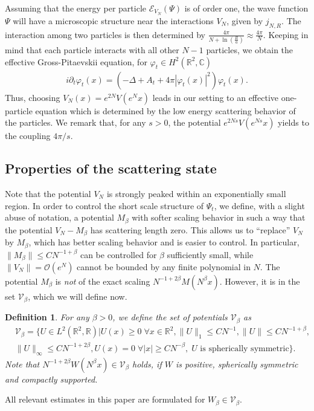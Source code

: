 \documentclass[11pt, english, american]{article}
\newtheorem{definition}[theorem] {Definition}
\renewcommand{\phi}{\varphi}
\begin{document}
Assuming that the energy per particle $\mathcal{E}_{V_N}(\Psi)$ is of order one, the wave function $\Psi$ will have a microscopic structure near the interactions $V_N$, given by $j_{N,R}$. 
The interaction among two particles is then determined by
$   \frac{4 \pi}{N+ \ln \left(\frac{R}{a}\right)} \approx \frac{4 \pi}{N}$. Keeping in mind that each particle interacts with all other $N-1$ particles, we obtain the effective Gross-Pitaevskii equation, for $\varphi_t \in H^2( \mathbb{R}^2, \mathbb{C})$
\begin{align*}
i \partial_t \varphi_t(x) = (- \Delta+A_t+ 4 \pi | \varphi_t(x)|^2) \varphi_t(x).
\end{align*}
Thus, choosing $V_N(x)= e^{2N} V(e^Nx)$ leads in our setting to an effective one-particle equation which is determined by the low energy scattering behavior of the particles. We remark that, for any $s>0$, the potential
$e^{2Ns} V(e^{Ns}x)$ yields to the coupling $4 \pi/ s$. 


\subsection{Properties of the scattering state}
Note that the potential $V_N$ is strongly peaked within an exponentially small region. 
In order to control the short scale structure of $\Psi_t$, we define, with a slight abuse of notation, a
potential $M_{\beta}$ with softer scaling behavior in such a way that the potential $V_N -M_\beta$
has scattering length zero.
This allows us to ``replace'' $V_N$  by $M_\beta$, which has better scaling behavior and is easier to control.
In particular, $\|M_\beta\| \leq C N^{-1+\beta}$ can be controlled for $\beta$ sufficiently small, while $\|V_N\|=\mathcal{O}(e^N)$ cannot be bounded by any finite polynomial in $N$. 
The potential $M_\beta$ is \textit{not} of the exact scaling $N^{-1+2\beta} M(N^{\beta} x)$. 
However, it is in the set $\mathcal{V}_{\beta}$, which we will define now.


\begin{definition}
For any $\beta>0$, we define the set of potentials $\mathcal{V}_{\beta}$ as
\begin{align*}
&
\mathcal{V}_{\beta}=
\Big\lbrace
U \in L^2(\mathbb{R}^2,\mathbb{R}) |
U(x) \geq 0 \; \forall x \in \mathbb{R}^2
,
\|U\|_1 \leq CN^{-1} 
,
\|U\| \leq CN^{-1+ \beta},
\\
& 
\|U\| _\infty \leq C N^{-1+2 \beta}
,
U(x)=0 \; \forall |x| \geq C N^{-\beta}
,\;
U\text{ is spherically symmetric}
\Big\rbrace .
\end{align*}
Note that $N^{-1+2\beta}W(N^\beta x) \in \mathcal{V}_\beta$ holds, if $W$ is positive, spherically symmetric and compactly supported.
\end{definition}
All relevant estimates in this paper are formulated for $W_\beta \in \mathcal{V}_\beta$.
\end{document}
